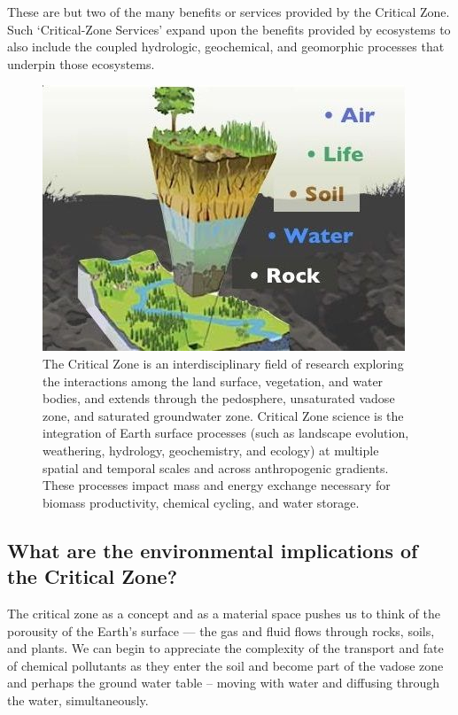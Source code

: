 \documentclass{book}\usepackage{knitr}
\begin{document}
These are but two of the many benefits or services provided by the Critical Zone. Such `Critical-Zone Services' expand upon the benefits provided by ecosystems to also include the coupled hydrologic, geochemical, and geomorphic processes that underpin those ecosystems.

\begin{figure}
\includegraphics[width=\textwidth]{images/critical-zone/criticalzone.jpg}
\caption{The Critical Zone is an interdisciplinary field of research exploring the interactions among the land surface, vegetation, and water bodies, and extends through the pedosphere, unsaturated vadose zone, and saturated groundwater zone. Critical Zone science is the integration of Earth surface processes (such as landscape evolution, weathering, hydrology, geochemistry, and ecology) at multiple spatial and temporal scales and across anthropogenic gradients. These processes impact mass and energy exchange necessary for biomass productivity, chemical cycling, and water storage.}
\label{fig:criticalzone}
\end{figure}

\subsection{What are the environmental implications of the Critical Zone?}

The critical zone as a concept and as a material space pushes us to think of the porousity of the Earth's surface --- the gas and fluid flows through rocks, soils, and plants. We can begin to appreciate the complexity of the transport and fate of chemical pollutants as they enter the soil and become part of the vadose zone and perhaps the ground water table -- moving with water and diffusing through the water, simultaneously.
\end{document}

